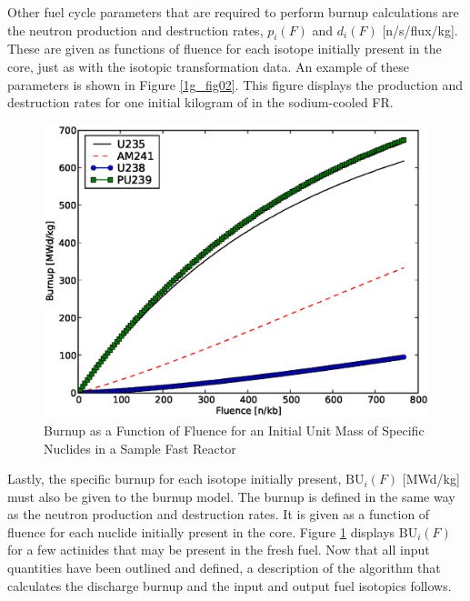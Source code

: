 Other fuel cycle parameters that are required to perform burnup calculations are the neutron 
production and destruction rates, $p_i(F)$ and $d_i(F)$ [n/s/flux/kg].  These are given 
as functions of fluence for each isotope initially present in the core, just as with the isotopic 
transformation data.  An example of these parameters is shown in Figure \ref{1g_fig02}.
This figure displays the production and destruction rates for one initial kilogram of  
in the sodium-cooled FR.  

\begin{figure}[htbp]
\caption{Burnup as a Function of Fluence for an Initial Unit Mass of Specific Nuclides in a Sample Fast Reactor}
\label{1g_fig03}
\begin{center}
\includegraphics[scale=0.5]{one_group_method/figs/Fig03.eps}
\end{center}
\end{figure}

Lastly, the specific burnup for each isotope initially present, $\mbox{BU}_i(F)$ 
[MWd/kg] must also be given to the burnup model.  The burnup is defined 
in the same way as the neutron 
production and destruction rates.  It is given as a function of fluence for each nuclide initially 
present in the core.  Figure \ref{1g_fig03} displays $\mbox{BU}_i(F)$ for a few actinides that may 
be present in the fresh fuel.
Now that all input quantities have been outlined and defined, a description of the 
algorithm that calculates the discharge burnup and the input and output fuel isotopics follows.   




